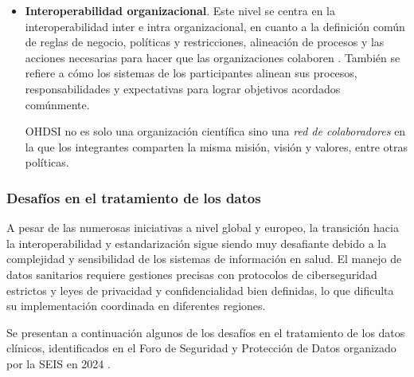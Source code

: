 \begin{itemize}
    \item \textbf{Interoperabilidad organizacional}. Este nivel se centra en la interoperabilidad inter e intra organizacional, en cuanto a la definición común de reglas de negocio, políticas y restricciones, alineación de procesos y las acciones necesarias para hacer que las organizaciones colaboren \cite{motta2019conceptual}. También se refiere a cómo los sistemas de los participantes alinean sus procesos, responsabilidades y expectativas para lograr objetivos acordados comúnmente.

    OHDSI no es solo una organización científica sino una \textit{red de colaboradores} en la que los integrantes comparten la misma misión, visión y valores, entre otras políticas.

\end{itemize}

\subsubsection{Desafíos en el tratamiento de los datos}


A pesar de las numerosas iniciativas a nivel global y europeo, la transición hacia la interoperabilidad y estandarización sigue siendo muy desafiante debido a la complejidad y sensibilidad de los sistemas de información en salud. El manejo de datos sanitarios requiere gestiones precisas con protocolos de ciberseguridad estrictos y leyes de privacidad y confidencialidad bien definidas, lo que dificulta su implementación coordinada en diferentes regiones.

Se presentan a continuación algunos de los desafíos en el tratamiento de los datos clínicos, identificados en el Foro de Seguridad y Protección de Datos organizado por la SEIS en 2024 \cite{SEIS2024tercera, SEIS2024octava}.

